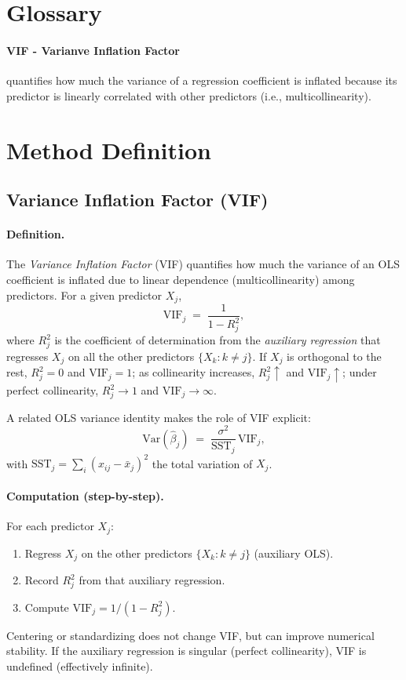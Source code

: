\section{Glossary}
\paragraph{VIF - Varianve Inflation Factor}
quantifies how much the variance of a regression coefficient is inflated because its predictor is linearly correlated with other predictors (i.e., multicollinearity).


\section{Method Definition}

\subsection{Variance Inflation Factor (VIF)}\label{subsec:vif}

\paragraph{Definition.}
The \emph{Variance Inflation Factor} (VIF) quantifies how much the variance of an OLS coefficient is inflated due to linear dependence (multicollinearity) among predictors. For a given predictor $X_j$,
\[
\mathrm{VIF}_j \;=\; \frac{1}{1 - R_j^2},
\]
where $R_j^2$ is the coefficient of determination from the \emph{auxiliary regression} that regresses $X_j$ on all the other predictors $\{X_k: k\neq j\}$. If $X_j$ is orthogonal to the rest, $R_j^2{=}0$ and $\mathrm{VIF}_j{=}1$; as collinearity increases, $R_j^2\uparrow$ and $\mathrm{VIF}_j\uparrow$; under perfect collinearity, $R_j^2\to 1$ and $\mathrm{VIF}_j\to\infty$.

A related OLS variance identity makes the role of VIF explicit:
\[
\mathrm{Var}(\hat\beta_j) \;=\; \frac{\sigma^2}{\mathrm{SST}_j}\,\mathrm{VIF}_j,
\]
with $\mathrm{SST}_j=\sum_i (x_{ij}-\bar x_j)^2$ the total variation of $X_j$.

\paragraph{Computation (step-by-step).}
For each predictor $X_j$:
\begin{enumerate}
  \item Regress $X_j$ on the other predictors $\{X_k: k\neq j\}$ (auxiliary OLS).
  \item Record $R_j^2$ from that auxiliary regression.
  \item Compute $\mathrm{VIF}_j = 1/(1-R_j^2)$.
\end{enumerate}
Centering or standardizing does not change VIF, but can improve numerical stability. If the auxiliary regression is singular (perfect collinearity), VIF is undefined (effectively infinite).

